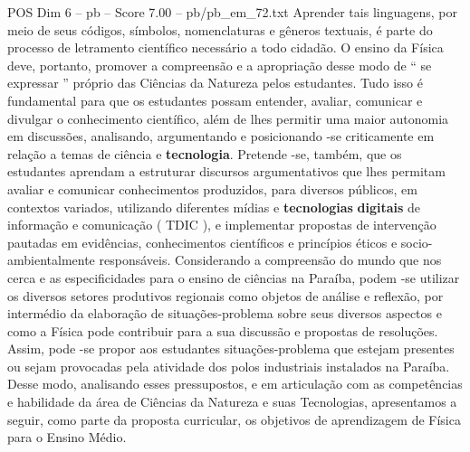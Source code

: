\begin{textsample}{POS Dim 6 – pb – Score 7.00 – pb/pb\_em\_72.txt}
Aprender tais linguagens, por meio de seus códigos, símbolos, nomenclaturas e gêneros textuais, é parte do processo de letramento científico necessário a todo cidadão.
O ensino da Física deve, portanto, promover a compreensão e a apropriação desse modo de “ se expressar ” próprio das Ciências da Natureza pelos estudantes.
Tudo isso é fundamental para que os estudantes possam entender, avaliar, comunicar e divulgar o conhecimento científico, além de lhes permitir uma maior autonomia em discussões, analisando, argumentando e posicionando -se criticamente em relação a temas de ciência e \textbf{tecnologia}.
Pretende -se, também, que os estudantes aprendam a estruturar discursos argumentativos que lhes permitam avaliar e comunicar conhecimentos produzidos, para diversos públicos, em contextos variados, utilizando diferentes mídias e \textbf{tecnologias} \textbf{digitais} de informação e comunicação ( TDIC ), e implementar propostas de intervenção pautadas em evidências, conhecimentos científicos e princípios éticos e socio-ambientalmente responsáveis.
Considerando a compreensão do mundo que nos cerca e as especificidades para o ensino de ciências na Paraíba, podem -se utilizar os diversos setores produtivos regionais como objetos de análise e reflexão, por intermédio da elaboração de situações-problema sobre seus diversos aspectos e como a Física pode contribuir para a sua discussão e propostas de resoluções.
Assim, pode -se propor aos estudantes situações-problema que estejam presentes ou sejam provocadas pela atividade dos polos industriais instalados na Paraíba.
Desse modo, analisando esses pressupostos, e em articulação com as competências e habilidade da área de Ciências da Natureza e suas Tecnologias, apresentamos a seguir, como parte da proposta curricular, os objetivos de aprendizagem de Física para o Ensino Médio.

\end{textsample}
